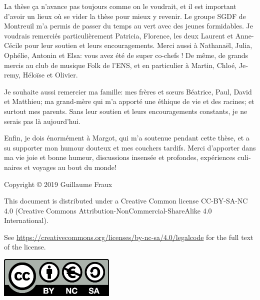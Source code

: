 \begin{otherlanguage}{french}
La thèse ça n'avance pas toujours comme on le voudrait, et il est important
d'avoir un lieux où se vider la thèse pour mieux y revenir. Le groupe SGDF de
Montreuil m'a permis de passer du temps au vert avec des jeunes formidables. Je
voudrais remerciés particulièrement Patricia, Florence, les deux Laurent et
Anne-Cécile pour leur soutien et leurs encouragements. Merci aussi à Nathanaël,
Julia, Ophélie, Antonin et Elsa: vous avez été de super co-chefs ! De même, de
grands mercis au club de musique Folk de l'ENS, et en particulier à Martin,
Chloé, Jeremy, Héloïse et Olivier.

Je souhaite aussi remercier ma famille: mes frères et sœurs Béatrice, Paul,
David et Matthieu; ma grand-mère qui m'a apporté une éthique de vie et des
racines; et surtout mes parents. Sans leur soutien et leurs encouragements
constants, je ne serais pas là aujourd'hui.

Enfin, je dois énormément à Margot, qui m'a soutenue pendant cette thèse, et a
su supporter mon humour douteux et mes couchers tardifs. Merci d'apporter dans
ma vie joie et bonne humeur, discussions insensée et profondes, expériences
culinaires et voyages au bout du monde!

\endgroup

\clearpage
\mbox{}
\thispagestyle{empty}
\clearpage

\ifweb

\mbox{}\vfill
\thispagestyle{empty}

Copyright © 2019 Guillaume Fraux

This document is distributed under a Creative Common license CC-BY-SA-NC 4.0
(Creative Commons Attribution-NonCommercial-ShareAlike 4.0 International).

See \url{https://creativecommons.org/licenses/by-nc-sa/4.0/legalcode} for the
full text of the license.

\begin{center}
    \includegraphics[width=15em]{figures/images/by-nc-sa-eu.png}
\end{center}

\clearpage
\mbox{}
\thispagestyle{empty}
\clearpage

\fi

\end{otherlanguage}
